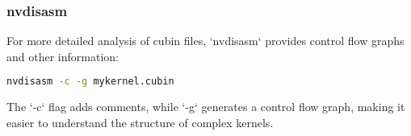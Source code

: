 \subsubsection{nvdisasm}

For more detailed analysis of cubin files, `nvdisasm` provides control flow graphs and other information:

\begin{lstlisting}[language=bash]
nvdisasm -c -g mykernel.cubin
\end{lstlisting}

The `-c` flag adds comments, while `-g` generates a control flow graph, making it easier to understand the structure of complex kernels.

